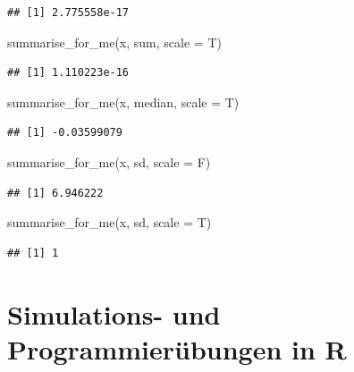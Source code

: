 \documentclass[
]{book}
\newenvironment{Shaded}{\begin{snugshade}}{\end{snugshade}}
\newcommand{\AttributeTok}[1]{\textcolor[rgb]{0.77,0.63,0.00}{#1}}
\newcommand{\FunctionTok}[1]{\textcolor[rgb]{0.00,0.00,0.00}{#1}}
\newcommand{\NormalTok}[1]{#1}
\begin{document}
\begin{verbatim}
## [1] 2.775558e-17
\end{verbatim}

\begin{Shaded}
\begin{Highlighting}[]
\FunctionTok{summarise\_for\_me}\NormalTok{(x, sum, }\AttributeTok{scale =}\NormalTok{ T)}
\end{Highlighting}
\end{Shaded}

\begin{verbatim}
## [1] 1.110223e-16
\end{verbatim}

\begin{Shaded}
\begin{Highlighting}[]
\FunctionTok{summarise\_for\_me}\NormalTok{(x, median, }\AttributeTok{scale =}\NormalTok{ T)}
\end{Highlighting}
\end{Shaded}

\begin{verbatim}
## [1] -0.03599079
\end{verbatim}

\begin{Shaded}
\begin{Highlighting}[]
\FunctionTok{summarise\_for\_me}\NormalTok{(x, sd, }\AttributeTok{scale =}\NormalTok{ F)}
\end{Highlighting}
\end{Shaded}

\begin{verbatim}
## [1] 6.946222
\end{verbatim}

\begin{Shaded}
\begin{Highlighting}[]
\FunctionTok{summarise\_for\_me}\NormalTok{(x, sd, }\AttributeTok{scale =}\NormalTok{ T)}
\end{Highlighting}
\end{Shaded}

\begin{verbatim}
## [1] 1
\end{verbatim}

\hypertarget{simulations--und-programmieruxfcbungen-in-r}{%
\chapter{Simulations- und Programmierübungen in R}\label{simulations--und-programmieruxfcbungen-in-r}}
\end{document}
